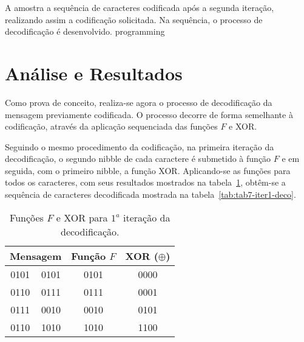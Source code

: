 \documentclass[a4paper,pra,aps,twocolumn,superscriptaddress,10pt,final]{revtex4-2}
\begin{document}

    A  amostra a sequência de caracteres codificada após a segunda iteração, realizando assim a codificação solicitada. Na sequência, o processo de decodificação é desenvolvido.
programming 
\section{Análise e Resultados}
\label{sec:analise_resultados}

    Como prova de conceito, realiza-se agora o processo de decodificação da mensagem previamente codificada. O processo decorre de forma semelhante à codificação, através da aplicação sequenciada das funções $F$ e XOR.
    
    Seguindo o mesmo procedimento da codificação, na primeira iteração da decodificação, o segundo nibble de cada caractere é submetido à função $F$ e em seguida, com o primeiro nibble, a função XOR. Aplicando-se as funções para todos os caracteres, com seus resultados mostrados na tabela~\ref{tab:tab6-funcao}, obtêm-se a sequência de caracteres decodificada mostrada na tabela~\ref{tab:tab7-iter1-deco}.

    \begin{table}[!htpb]
        \caption{Funções $F$ e XOR para $1^a$ iteração da decodificação.}
        \label{tab:tab6-funcao}
        \begin{tabular}{|cc|c|c|}
            \hline
            \multicolumn{2}{|c|}{\textbf{Mensagem}} & \textbf{Função $F$} & \textbf{XOR ($\oplus$)} \\ \hline
            \multicolumn{1}{|c|}{0101}    & 0101    & 0101                & 0000                                 \\ \hline
            \multicolumn{1}{|c|}{0110}    & 0111    & 0111                & 0001                                 \\ \hline
            \multicolumn{1}{|c|}{0111}    & 0010    & 0010                & 0101                                 \\ \hline
            \multicolumn{1}{|c|}{0110}    & 1010    & 1010                & 1100                                 \\ \hline
        \end{tabular}
    \end{table}
    
\end{document}
